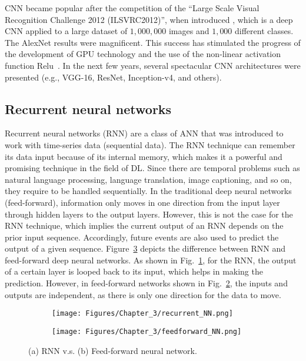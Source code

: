CNN became popular after the competition of the \enquote{Large Scale Visual Recognition Challenge 2012 (ILSVRC2012)}, when \textcite{Krizhevsky2012} introduced \textcite{Krizhevsky2012}, which is a deep CNN applied to a large dataset of \(1,000,000\) images and \(1,000\) different classes.
The AlexNet results were magnificent.
This success has stimulated the progress of the development of GPU technology and the use of the non-linear activation function Relu~\cite{Lecun2015}.
In the next few years, several spectacular CNN architectures were presented (e.g., VGG-16, ResNet, Inception-v4, and others).
\subsection{Recurrent neural networks}
\label{sec222}
Recurrent neural networks (RNN) are a class of ANN that was introduced to work with time-series data (sequential data).
The RNN technique can remember its data input because of its internal memory, which makes it a powerful and promising technique in the field of DL.
Since there are temporal problems such as natural language processing, language translation, image captioning, and so on, they require to be handled sequentia\-lly.
In the traditional deep neural networks (feed-forward), information only moves in one direction from the input layer through hidden layers to the output layers.
However, this is not the case for the RNN technique, which implies the current output of an RNN depends on the prior input sequence.
Accordingly, future events are also used to predict the output of a given sequence.
Figure~\ref{fig:rnn_vs_FFNN} depicts the difference between RNN and feed-forward deep neural networks.
As shown in Fig.~\ref{fig:rrn}, for the RNN, the output of a certain layer is looped back to its input, which helps in making the prediction.
However, in feed-forward networks shown in Fig.~\ref{fig:FFNN}, the inputs and outputs are independent, as there is only one direction for the data to move.
\begin{figure}[!ht]
	\centering
	\begin{subfigure}{0.49\textwidth}		
		\centering
		\texttt{[image: Figures/Chapter\_3/recurrent\_NN.png]}
		\caption{} 
		\label{fig:rrn}
	\end{subfigure}
	\hfill
	\begin{subfigure}{0.49\textwidth}
		\centering
		\texttt{[image: Figures/Chapter\_3/feedforward\_NN.png]}
		\caption{} 
		\label{fig:FFNN}
	\end{subfigure}	
	\caption{(a) RNN v.s. (b) Feed-forward neural network.}
	\label{fig:rnn_vs_FFNN}
\end{figure}

